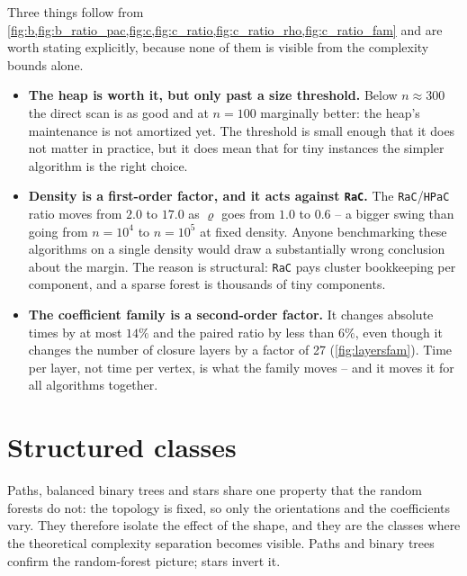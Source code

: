 \documentclass[11pt]{article}
\begin{document}
Three things follow from \cref{fig:b,fig:b_ratio_pac,fig:c,fig:c_ratio,fig:c_ratio_rho,fig:c_ratio_fam}
and are worth stating explicitly, because none of them is visible from the
complexity bounds alone.

\begin{itemize}
  \item \textbf{The heap is worth it, but only past a size threshold.} Below
  $n\approx300$ the direct scan is as good and at $n=100$ marginally better:
  the heap's maintenance is not amortized yet. The threshold is small enough
  that it does not matter in practice, but it does mean that for tiny
  instances the simpler algorithm is the right choice.
  \item \textbf{Density is a first-order factor, and it acts against
  \texttt{RaC}.} The \texttt{RaC}/\texttt{HPaC} ratio moves from $2.0$ to
  $17.0$ as $\varrho$ goes from $1.0$ to $0.6$ -- a bigger swing than going
  from $n=10^4$ to $n=10^5$ at fixed density. Anyone benchmarking these
  algorithms on a single density would draw a substantially wrong conclusion
  about the margin. The reason is structural: \texttt{RaC} pays cluster
  bookkeeping per component, and a sparse forest is thousands of tiny
  components.
  \item \textbf{The coefficient family is a second-order factor.} It changes
  absolute times by at most $14\%$ and the paired ratio by less than $6\%$,
  even though it changes the number of closure layers by a factor of 27
  (\cref{fig:layersfam}). Time per layer, not time per vertex, is what the
  family moves -- and it moves it for all algorithms together.
\end{itemize}

\section{Structured classes}\label{sec:structured}

Paths, balanced binary trees and stars share one property that the random
forests do not: the topology is fixed, so only the orientations and the
coefficients vary. They therefore isolate the effect of the shape, and they
are the classes where the theoretical complexity separation becomes visible.
Paths and binary trees confirm the random-forest picture; stars invert it.
\end{document}
